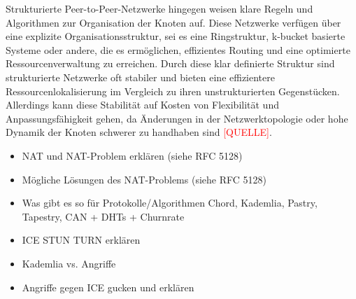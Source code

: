 Strukturierte Peer-to-Peer-Netzwerke hingegen weisen klare Regeln und Algorithmen zur Organisation der Knoten auf. Diese Netzwerke verfügen über eine explizite Organisationsstruktur, sei es eine Ringstruktur, k-bucket basierte Systeme oder andere, die es ermöglichen, effizientes Routing und eine optimierte Ressourcenverwaltung zu erreichen. Durch diese klar definierte Struktur sind strukturierte Netzwerke oft stabiler und bieten eine effizientere Ressourcenlokalisierung im Vergleich zu ihren unstrukturierten Gegenstücken. Allerdings kann diese Stabilität auf Kosten von Flexibilität und Anpassungsfähigkeit gehen, da Änderungen in der Netzwerktopologie oder hohe Dynamik der Knoten schwerer zu handhaben sind \textcolor{red}{[QUELLE]}.



\begin{itemize}
    \item NAT und NAT-Problem erklären (siehe RFC 5128)
    \item Mögliche Lösungen des NAT-Problems (siehe RFC 5128)
    \item Was gibt es so für Protokolle/Algorithmen Chord, Kademlia, Pastry, Tapestry, CAN + DHTs + Churnrate
    \item ICE STUN TURN erklären
    \item Kademlia vs. Angriffe
    \item Angriffe gegen ICE gucken und erklären
\end{itemize}